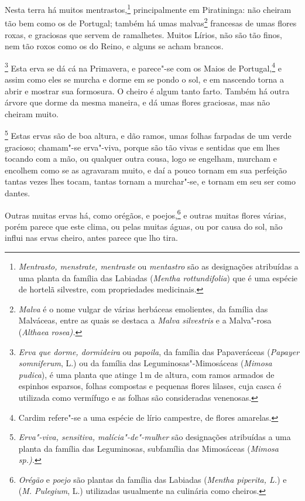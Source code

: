 Nesta terra há muitos mentrastos,\footnote{ \textit{Mentrasto,
menstrate, mentraste} ou \textit{mentastro} são as designações
atribuídas a uma planta da família das Labiadas (\textit{Mentha
rottundifolia}) que é uma espécie de hortelã silvestre, com
propriedades medicinais.} principalmente em Piratininga: não cheiram
tão bem como os de Portugal; também há umas malvas\footnote{ \textit{Malva} 
é o nome vulgar de várias herbáceas emolientes, da
família das Malváceas, entre as quais se destaca a \textit{Malva
silvestris} e a Malva"-rosa (\textit{Althaea rosea).}} francesas de umas
flores roxas, e graciosas que servem de ramalhetes. Muitos Lírios, não
são tão finos, nem tão roxos como os do Reino, e alguns se acham brancos.

\footnote{ \textit{Erva que dorme, dormideira}
ou \textit{papoila}, da família das Papaveráceas (\textit{Papayer
somniferum}, L.) ou da família das Leguminosas"-Mimosáceas
(\textit{Mimosa pudica}), é uma planta que atinge 1\,m de altura, com
ramos armados de espinhos esparsos, folhas compostas e pequenas flores
lilases, cuja casca é utilizada como vermífugo e as folhas são
consideradas venenosas.} Esta erva se dá cá na Primavera, e
parece"-se com os Maios de Portugal,\footnote{ Cardim refere"-se a uma
espécie de lírio campestre, de flores amarelas.} e assim como eles se
murcha e dorme em se pondo o sol, e em nascendo torna a abrir e mostrar
sua formosura. O cheiro é algum tanto farto. Também há outra árvore que
dorme da mesma maneira, e dá umas flores graciosas, mas não cheiram muito.

\footnote{ \textit{Erva"-viva, sensitiva,
malícia"-de"-mulher} são designações atribuídas a uma planta da família 
das Leguminosas, subfamília das Mimosáceas (\textit{Mimosa
sp.).}} Estas ervas são de boa altura, e dão ramos, umas
folhas farpadas de um verde gracioso; chamam"-se erva"-viva, porque são
tão vivas e sentidas que em lhes tocando com a mão, ou qualquer outra
cousa, logo se engelham, murcham e encolhem como se as agravaram muito,
e daí a pouco tornam em sua perfeição tantas vezes lhes tocam, tantas
tornam a murchar"-se, e tornam em seu ser como dantes.

 Outras muitas ervas há, como orégãos, e poejos,\footnote{ \textit{Orégão} 
e \textit{poejo} são plantas da família das Labiadas
(\textit{Mentha piperita, L.}) e (\textit{M. Pulegium}, L.) utilizadas
usualmente na culinária como cheiros.} e outras muitas flores várias,
porém parece que este clima, ou pelas muitas águas, ou por causa do
sol, não influi nas ervas cheiro, antes parece que lho tira.

